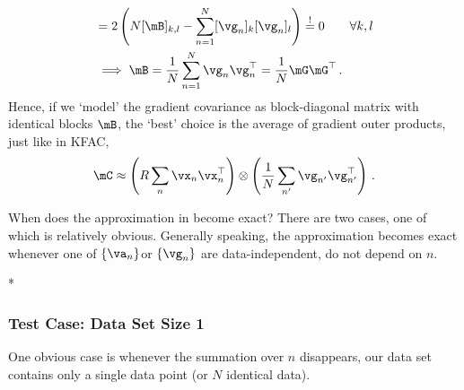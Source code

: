 \begin{example}
\begin{align*}
    &=
      2 \left( N[\mB]_{k,l} - \sum_{n=1}^N [\vg_n]_k [\vg_n]_l \right)
      \stackrel{!}{=} 0 \qquad\forall k,l
    \\
    &\implies
      \mB = \frac{1}{N} \sum_{n=1}^N \vg_n \vg_n^{\top}
      = \frac{1}{N} \mG \mG^{\top}\,.
  \end{align*}
  Hence, if we `model' the gradient covariance as block-diagonal matrix with identical blocks $\mB$, the `best' choice is the average of gradient outer products, just like in KFAC,
  \begin{align*}
    \mC
    \approx
    \left(R \sum_n \vx_n \vx_n^\top \right)
    \otimes
    \left(\frac{1}{N} \sum_{n'} \vg_{n'} \vg_{n'}^\top \right)\,.
  \end{align*}
\end{example}

When does the approximation in  become exact?
There are two cases, one of which is relatively obvious.
Generally speaking, the approximation becomes exact whenever one of $\{\va_n\}$or $\{\vg_n\}$ are data-independent, \ie do not depend on $n$.


\switchcolumn[1]*
\switchcolumn[0]

\subsubsection{Test Case: Data Set Size 1}
One obvious case is whenever the summation over $n$ disappears, \ie our data set contains only a single data point (or $N$ identical data).


